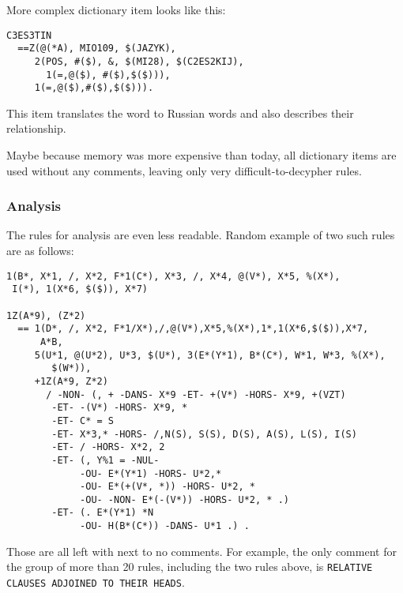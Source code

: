More complex dictionary item looks like this:
\begin{verbatim}
C3ES3TIN
  ==Z(@(*A), MIO109, $(JAZYK), 
     2(POS, #($), &, $(MI28), $(C2ES2KIJ),
       1(=,@($), #($),$($))),
     1(=,@($),#($),$($))).
\end{verbatim}

This item translates the word  to Russian words  and also describes their relationship.

Maybe because memory was more expensive than today, all dictionary items are used without any comments, leaving only very difficult-to-decypher rules.
\subsubsection{Analysis}

The rules for analysis are even less readable. Random example of two such rules are as follows:

\begin{verbatim}
1(B*, X*1, /, X*2, F*1(C*), X*3, /, X*4, @(V*), X*5, %(X*),
 I(*), 1(X*6, $($)), X*7)

1Z(A*9), (Z*2)
  == 1(D*, /, X*2, F*1/X*),/,@(V*),X*5,%(X*),1*,1(X*6,$($)),X*7,
      A*B,
     5(U*1, @(U*2), U*3, $(U*), 3(E*(Y*1), B*(C*), W*1, W*3, %(X*), 
        $(W*)),
     +1Z(A*9, Z*2)
       / -NON- (, + -DANS- X*9 -ET- +(V*) -HORS- X*9, +(VZT)
        -ET- -(V*) -HORS- X*9, *
        -ET- C* = S
        -ET- X*3,* -HORS- /,N(S), S(S), D(S), A(S), L(S), I(S)
        -ET- / -HORS- X*2, 2
        -ET- (, Y%1 = -NUL-
             -OU- E*(Y*1) -HORS- U*2,*
             -OU- E*(+(V*, *)) -HORS- U*2, *
             -OU- -NON- E*(-(V*)) -HORS- U*2, * .)
        -ET- (. E*(Y*1) *N
             -OU- H(B*(C*)) -DANS- U*1 .) .
\end{verbatim}

Those are all left with next to no comments. For example, the only comment for the group of more than 20 rules, including the two rules above, is \texttt{RELATIVE CLAUSES ADJOINED TO THEIR HEADS}.

